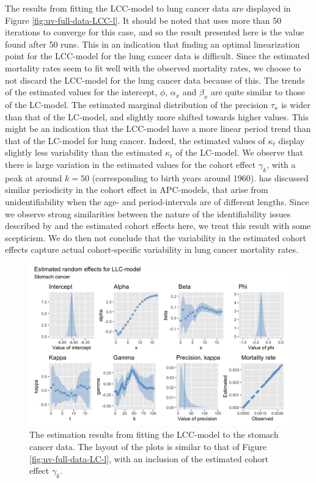 \newpar The results from fitting the LCC-model to lung cancer data are displayed in Figure \ref{fig:uv-full-data-LCC-l}. It should be noted that \inlabru uses more than 50 iterations to converge for this case, and so the result presented here is the value found after 50 runs. This in an indication that finding an optimal linearization point for the LCC-model for the lung cancer data is difficult. Since the estimated mortality rates seem to fit well with the observed mortality rates, we choose to not discard the LCC-model for the lung cancer data because of this. The trends of the estimated values for the intercept, $\phi$, $\alpha_x$ and $\beta_x$ are quite similar to those of the LC-model. The estimated marginal distribution of the precision $\tau_\kappa$ is wider than that of the LC-model, and slightly more shifted towards higher values. This might be an indication that the LCC-model have a more linear period trend than that of the LC-model for lung cancer. Indeed, the estimated values of $\kappa_t$ display slightly less variability than the estimated $\kappa_t$ of the LC-model. We observe that there is large variation in the estimated values for the cohort effect $\gamma_k$, with a peak at around $k = 50$ (corresponding to birth years around 1960). \textcite{RieblerThesis2010} has discussed similar periodicity in the cohort effect in APC-models, that arise from unidentifiability when the age- and period-intervals are of different lengths. Since we observe strong similarities between the nature of the identifiability issues described by \textcite{RieblerThesis2010} and the estimated cohort effects here, we treat this result with some scepticism. We do then not conclude that the variability in the estimated cohort effects capture actual cohort-specific variability in lung cancer mortality rates. 

\begin{figure}
    \centering
    \includegraphics[width=0.85\linewidth]{real-data/real-data-univariate/Figures/uv-full-data-lcc-s.png}
    \caption{The estimation results from fitting the LCC-model to the stomach cancer data. The layout of the plots is similar to that of Figure \ref{fig:uv-full-data-LC-l}, with an inclusion of the estimated cohort effect $\gamma_k$.}
    \label{fig:uv-full-data-LCC-s}
\end{figure}

